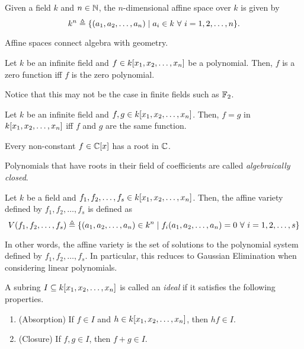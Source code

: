 \documentclass[twoside]{article}
\begin{document}
\begin{definition}
    Given a field \(k\) and \(n \in \mathbb N\), the \(n\)-dimensional affine space
    over \(k\) is given by
    \begin{equation}
        k^n \triangleq \{(a_1, a_2, \ldots, a_n) \mid a_i \in k\ \forall\ i = 1, 2, \ldots, n\}.
        \label{eq:affine-space}
    \end{equation}
\end{definition}
Affine spaces connect algebra with geometry.

\begin{proposition}
    Let \(k\) be an infinite field and \(f \in k[x_1, x_2, \ldots, x_n]\)
    be a polynomial. Then, \(f\) is a zero function iff \(f\) is the zero
    polynomial.
\end{proposition}
Notice that this may not be the case in finite fields such as \(\mathbb F_2\).

\begin{corollary}
    Let \(k\) be an infinite field and \(f, g \in k[x_1, x_2, \ldots,
    x_n]\). Then, \(f = g\) in \(k[x_1, x_2, \ldots, x_n]\) iff \(f\) and
    \(g\) are the same function.
\end{corollary}

\begin{theorem}
    Every non-constant \(f \in \mathbb C[x]\) has a root in \(\mathbb C\).
\end{theorem}
Polynomials that have roots in their field of coefficients are called
\emph{algebraically closed}.

\begin{definition}
    Let \(k\) be a field and \(f_1, f_2, \ldots, f_s \in k[x_1, x_2,
    \ldots, x_n]\). Then, the affine variety defined by \(f_1, f_2, \ldots,
    f_s\) is defined as
    \begin{equation}
        V(f_1, f_2, \ldots, f_s) \triangleq \{(a_1, a_2, \ldots, a_n) \in k^n \mid f_i(a_1, a_2, \ldots, a_n) = 0\ \forall\ i = 1, 2, \ldots, s\}
    \end{equation}
\end{definition}
In other words, the affine variety is the set of solutions to the polynomial
system defined by \(f_1, f_2, \ldots, f_s\). In particular, this reduces to
Gaussian Elimination when considering linear polynomials.

\begin{definition}[Ideal]
    A subring \(I \subseteq k[x_1, x_2, \ldots, x_n]\) is called an
    \emph{ideal} if it satisfies the following properties.
    \begin{enumerate}
        \item (Absorption) If \(f \in I\) and \(h \in k[x_1, x_2, \ldots,
        x_n]\), then \(h f \in I\).
        \item (Closure) If \(f, g \in I\), then \(f + g \in I\).
    \end{enumerate}
\end{definition}
\end{document}
